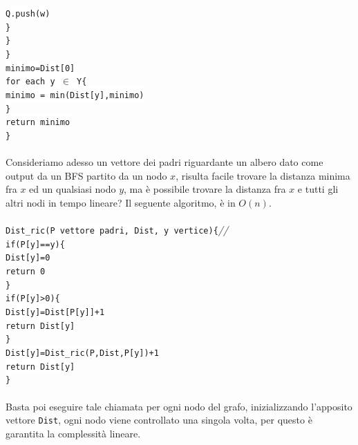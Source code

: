 \documentclass[12pt, letterpaper]{article}
\newcommand{\code}[1]{\colorbox{light-gray}{\texttt{#1}}}
\newcommand{\codee}[1]{\colorbox{white}{\texttt{#1}}}
\newcommand{\acc}{\\\hphantom{}\\}
\newcommand{\comm}[1]{\color{lg}\textit{\hphantom{spaz}// \text{#1}}\color{black}}
\begin{document}
\hphantom{ident}\hphantom{ident}\hphantom{ident}\codee{}\hphantom{ident}\codee{Q.push(w)}\\
\hphantom{ident}\hphantom{ident}\hphantom{ident}\codee{\}}\\
\hphantom{ident}\hphantom{ident}\codee{\}}\\
\hphantom{ident}\codee{\}}\\
\hphantom{ident}\codee{minimo=Dist[0]}\\
\hphantom{ident}\codee{for each y $\in$ Y\{}\\
\hphantom{ident}\hphantom{ident}\codee{minimo = min(Dist[y],minimo)}\\
\hphantom{ident}\codee{\}}\\
\hphantom{ident}\codee{return minimo}\\
\codee{\}}\acc
Consideriamo adesso un vettore dei padri riguardante un albero dato come output da un BFS partito da un nodo $x$, risulta 
facile trovare la distanza minima fra $x$ ed un qualsiasi nodo $y$, ma è possibile trovare la distanza fra 
$x$ e tutti gli altri nodi in tempo lineare? Il seguente algoritmo, è in $O(n)$.\acc
\codee{Dist\_ric(P vettore padri, Dist, y vertice)\{}\comm{chiamata ricorsiva}\\
\hphantom{ident}\codee{if(P[y]==y)\{}\\
\hphantom{ident}\hphantom{ident}\codee{Dist[y]=0}\\
\hphantom{ident}\hphantom{ident}\codee{return 0}\\
\hphantom{ident}\codee{\}}\\
\hphantom{ident}\codee{if(P[y]>0)\{}\\
\hphantom{ident}\hphantom{ident}\codee{Dist[y]=Dist[P[y]]+1}\\
\hphantom{ident}\hphantom{ident}\codee{return Dist[y]}\\
\hphantom{ident}\codee{\}}\\
\hphantom{ident}\codee{Dist[y]=Dist\_ric(P,Dist,P[y])+1}\\
\hphantom{ident}\codee{return Dist[y]}\\
\codee{\}}\acc
Basta poi eseguire tale chiamata per ogni nodo del grafo, inizializzando l'apposito vettore \code{Dist}, ogni nodo viene controllato 
una singola volta, per questo è garantita la complessità lineare.
\end{document}

